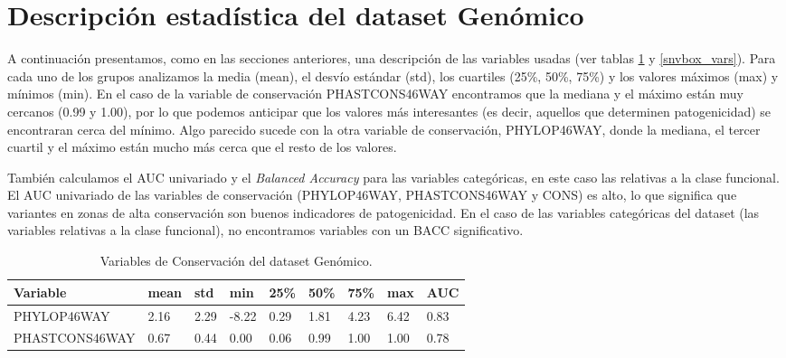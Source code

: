 \section{Descripción estadística del dataset Genómico}

A continuación presentamos, como en las secciones anteriores, una descripción de las variables usadas (ver tablas \ref{conservacion_vars} y \ref{snvbox_vars}). Para cada uno de los grupos analizamos la media (mean), el desvío estándar (std), los cuartiles (25\%, 50\%, 75\%) y los valores máximos (max) y mínimos (min). En el caso de la variable de conservación PHASTCONS46WAY encontramos que la mediana y el máximo están muy cercanos (0.99 y 1.00), por lo que podemos anticipar que los valores más interesantes (es decir, aquellos que determinen patogenicidad) se encontraran cerca del mínimo. Algo parecido sucede con la otra variable de conservación, PHYLOP46WAY, donde la mediana, el tercer cuartil y el máximo están mucho más cerca que el resto de los valores.

También calculamos el AUC univariado y el \textit{Balanced Accuracy} para las variables categóricas, en este caso las relativas a la clase funcional. El AUC univariado de las variables de conservación (PHYLOP46WAY, PHASTCONS46WAY y CONS) es alto, lo que significa que variantes en zonas de alta conservación son buenos indicadores de patogenicidad. En el caso de las variables categóricas del dataset (las variables relativas a la clase funcional), no encontramos variables con un BACC significativo.

\newpage

\begin{table}[H]
\centering
\begin{tabular}{|l|l|l|l|l|l|l|l|l|}
\hline
Variable & mean & std & min & 25\%  & 50\% & 75\%  & max & AUC \\ \hline
PHYLOP46WAY & 2.16 &  2.29 & -8.22 &  0.29 &  1.81 &  4.23 &  6.42 & 0.83 \\ \hline
PHASTCONS46WAY & 0.67 & 0.44 &  0.00 &  0.06 &  0.99 &  1.00 &  1.00 & 0.78 \\ \hline
\end{tabular}
\caption{Variables de Conservación del dataset Genómico.}
\label{conservacion_vars}
\end{table}


